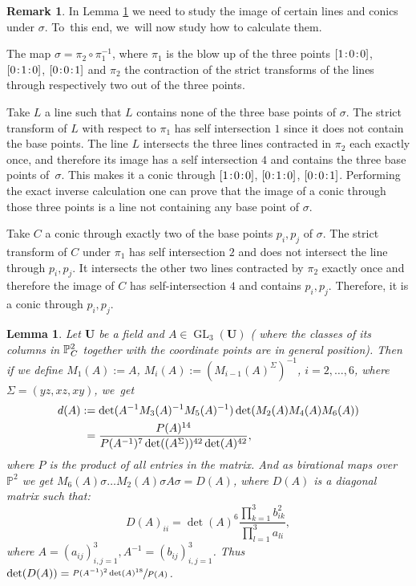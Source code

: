 \documentclass[10pt,a4paper]{amsart}
\newcommand{\sep}{\mkern2mu{:}\mkern2mu}
\newtheorem{lemma}[theorem]{Lemma}
\theoremstyle{definition}
\newtheorem{remark}[theorem]{Remark}
\DeclareMathOperator{\GL}{GL}
\begin{document}
\begin{remark} \label{rem: image under sigma}
In Lemma \ref{LargeCalc} we need to study the image of certain lines and conics under $\sigma$. To~this end, we~will now study how to calculate them.

The map $\sigma = \pi_2 \circ \pi_1^{-1}$, where $\pi_1$ is the blow up of the three points $[1\sep 0\sep 0]$, $[0\sep 1\sep 0]$, $[0\sep 0\sep 1]$ and $\pi_2$ the contraction of the strict transforms of the lines through respectively two out of the three points.

Take $L$ a line such that $L$ contains none of the three base points of $\sigma$. The strict transform of $L$ with respect to $\pi_1$ has self intersection $1$ since it does not contain the base points. The line $L$ intersects the three lines contracted in $\pi_2$ each exactly once, and therefore its image has a self intersection $4$ and contains the three base points of~$\sigma$. This makes it a conic through $[1\sep 0\sep 0]$, $[0\sep 1\sep 0]$, $[0\sep 0\sep 1]$. Performing the exact inverse calculation one can prove that the image of a conic through those three points is a line not containing any base point of $\sigma$.

Take $C$ a conic through exactly two of the base points $p_i,p_j$ of $\sigma$. The strict transform of $C$ under $\pi_1$ has self intersection $2$ and does not intersect the line through $p_i,p_j$. It intersects the other two lines contracted by $\pi_2$ exactly once and therefore the image of $C$ has self-intersection $4$ and contains $p_i,p_j$. Therefore, it is a conic through $p_i,p_j$.
\end{remark}

\begin{lemma} \label{LargeCalc}
Let $\mathbf{U}$ be a field and $A \in \GL_3(\mathbf{U})$ ( where the classes of its columns in $\mathbb{P}^2_{\emph{C}}$ together with the coordinate points are in general position). Then if we define $M_1(A):= A$, $M_i(A) := (M_{i-1}(A)^{\Sigma})^{-1}$, $i=2, \dots , 6$, where $\Sigma = (yz,xz,xy)$, we~get
\begin{align*}
d(A)&:= \det(A^{-1}M_3(A)^{-1}M_5(A)^{-1})\det(M_2(A)M_4(A)M_6(A))
\\
&\hphantom{:}= \frac{P(A)^{14}}{P(A^{-1})^7 \det((A^{\Sigma}))^{42}\det(A)^{42}},
\end{align*}
where $P$ is the product of all entries in the matrix. And as birational maps over $\mathbb{P}^2$ we get $M_6(A) \sigma \dots M_2(A) \sigma A \sigma = D(A)$, where $D(A)$ is a diagonal matrix such that:
\[
D(A)_{ii} = \det(A)^6\frac{\prod_{k=1}^3 b_{ik}^2}{\prod_{l=1}^3a_{li}},
\]
where $A = (a_{ij})_{i,j = 1}^3, A^{-1} = (b_{ij})_{i,j = 1}^3$. Thus $\det(D(A)) =\sfrac{P(A^{-1})^2\det(A)^{18}}{P(A)}$.
\end{lemma}
\end{document}
